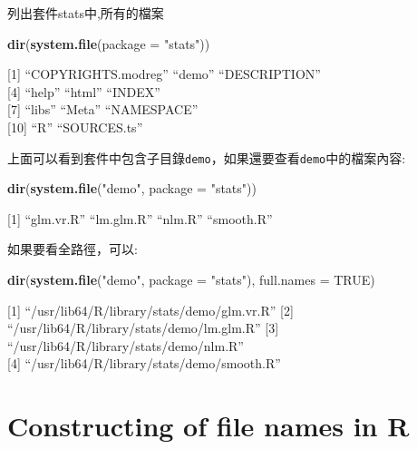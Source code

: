 \documentclass[]{book}
\newenvironment{Shaded}{\begin{snugshade}}{\end{snugshade}}
\newcommand{\DataTypeTok}[1]{\textcolor[rgb]{0.13,0.29,0.53}{#1}}
\newcommand{\KeywordTok}[1]{\textcolor[rgb]{0.13,0.29,0.53}{\textbf{#1}}}
\newcommand{\NormalTok}[1]{#1}
\newcommand{\OtherTok}[1]{\textcolor[rgb]{0.56,0.35,0.01}{#1}}
\newcommand{\StringTok}[1]{\textcolor[rgb]{0.31,0.60,0.02}{#1}}
\theoremstyle{definition}
\theoremstyle{definition}
\theoremstyle{definition}
\theoremstyle{remark}
\begin{document}
列出套件stats中,所有的檔案

\begin{Shaded}
\begin{Highlighting}[]
\KeywordTok{dir}\NormalTok{(}\KeywordTok{system.file}\NormalTok{(}\DataTypeTok{package =} \StringTok{"stats"}\NormalTok{))}
\end{Highlighting}
\end{Shaded}

{[}1{]} ``COPYRIGHTS.modreg'' ``demo'' ``DESCRIPTION''\\
{[}4{]} ``help'' ``html'' ``INDEX''\\
{[}7{]} ``libs'' ``Meta'' ``NAMESPACE''\\
{[}10{]} ``R'' ``SOURCES.ts''

上面可以看到套件中包含子目錄\texttt{demo}，如果還要查看\texttt{demo}中的檔案內容:

\begin{Shaded}
\begin{Highlighting}[]
\KeywordTok{dir}\NormalTok{(}\KeywordTok{system.file}\NormalTok{(}\StringTok{"demo"}\NormalTok{, }\DataTypeTok{package =} \StringTok{"stats"}\NormalTok{))}
\end{Highlighting}
\end{Shaded}

{[}1{]} ``glm.vr.R'' ``lm.glm.R'' ``nlm.R'' ``smooth.R''

如果要看全路徑，可以:

\begin{Shaded}
\begin{Highlighting}[]
\KeywordTok{dir}\NormalTok{(}\KeywordTok{system.file}\NormalTok{(}\StringTok{"demo"}\NormalTok{, }\DataTypeTok{package =} \StringTok{"stats"}\NormalTok{), }\DataTypeTok{full.names =} \OtherTok{TRUE}\NormalTok{)}
\end{Highlighting}
\end{Shaded}

{[}1{]} ``/usr/lib64/R/library/stats/demo/glm.vr.R'' {[}2{]}
``/usr/lib64/R/library/stats/demo/lm.glm.R'' {[}3{]}
``/usr/lib64/R/library/stats/demo/nlm.R''\\
{[}4{]} ``/usr/lib64/R/library/stats/demo/smooth.R''

\hypertarget{constructing-of-file-names-in-r}{%
\section{Constructing of file names in
R}\label{constructing-of-file-names-in-r}}
\end{document}
